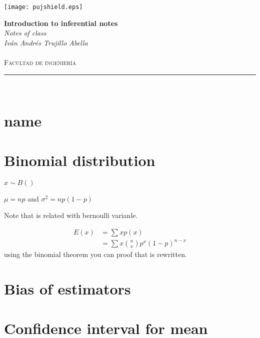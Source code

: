\documentclass[10pt,a4paper]{article}
\author{Iván Andrés Trujillo }
\begin{document}
\newcommand{\HRule}{\rule{\linewidth}{0.5mm}}


\graphicspath{{/home/ces/Pictures/puj/}}
\texttt{[image: pujshield.eps]}\\[0.5cm] 

\begin{center} 
\textbf{\LARGE Introduction to inferential notes}\\[0.2cm]
\emph{\LARGE Notes of class}\\[0.3cm] 
\emph{Iván Andrés Trujillo Abella} \\
\textsc{\Large 
}\\[0.2cm] 
\textsc{\large Facultad de ingeniería}\\[0.5cm] 
\HRule \\[0.4cm]
\end{center}
\vspace{1cm}
\section{name}




\section{Binomial distribution}
$ x \sim B()$

$\mu = np$ and $ \sigma^{2} =  np(1-p)$

Note that is related with bernoulli varianle.

\begin{equation}
\begin{align*}
E(x) &= \sum xp (x) \\
     &= \sum x \binom{n}{x} p^{x}(1-p)^{n-x}
\end{align*}
\end{equation}
using the binomial theorem you can proof that is rewritten.





\section{Bias of estimators}




\section{Confidence interval for mean}
\end{document}
